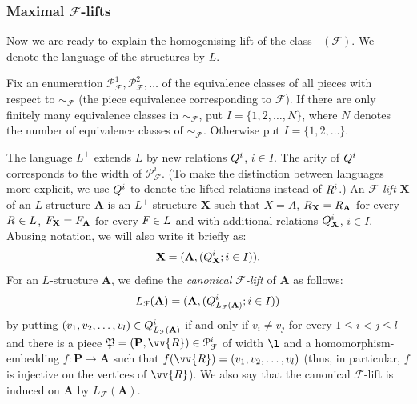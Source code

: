 \documentclass{elsarticle}
\def\Forb{\mathop{\mathrm{Forb_{he}}}\nolimits}
\def\str#1{\mathbf {#1}}
\def\nbrel#1#2{R\ifstrempty{#1}{}{_{#1}}\ifstrempty{#2}{}{^{#2}}}
\def\rel#1#2{\nbrel{\ifstrempty{#1}{}{\str{#1}}}{#2}}
\def\func#1#2{\nbfunc{\ifstrempty{#1}{}{\str{#1}}}{#2}}
\def\nbfunc#1#2{F\ifstrempty{#1}{}{_{#1}}\ifstrempty{#2}{}{^{#2}}}
\def\extl#1#2{Q\ifstrempty{#1}{}{_{#1}}\ifstrempty{#2}{}{^{#2}}}
\def\ext#1#2{\extl{\ifstrempty{#1}{}{\str{#1}}}{#2}}
\def\F{{\mathcal F}}
\def\Piece{{\mathfrak P}}
\def\PieceEq{{\mathcal P}}
\theoremstyle{plain}
\theoremstyle{definition}
\theoremstyle{remark}
\begin{document}
\subsubsection{Maximal $\F$-lifts}
\label{sec:Flifts}
Now we are ready to explain the homogenising lift of the class $\Forb(\F)$. We
denote the language of the structures by $L$.

Fix an enumeration $\PieceEq_\F^1, \PieceEq_\F^2,\ldots$ of the equivalence
classes of all pieces with respect to $\sim_\F$ (the piece equivalence corresponding to $\F$).  If there are only finitely many equivalence
classes in $\sim_\F$, put $I=\{1,2,\ldots, N\}$, where $N$ denotes the number
of equivalence classes of $\sim_\F$. Otherwise put $I=\{1,2,\ldots\}$.  

The language $L^+$ extends $L$ by new relations $\ext{}{i}$, $i\in I$. The arity of $\ext{}{i}$ corresponds
to the width of $\PieceEq_\F^i$. (To make the distinction between languages more explicit, we use $\ext{}{i}$ to denote the lifted relations instead of $\rel{}{i}$.)
An \emph{$\F$-lift} $\str{X}$ of an $L$-structure $\str{A}$ is an $L^+$-structure $\str{X}$ such that $X=A$, $\rel{X}{}=\rel{A}{}$ for every $\rel{}{}\in L$, $\func{X}{}=\func{A}{}$ for every $\func{}{}\in L$ and with additional relations $\ext{X}{i}$, $i\in I$. Abusing notation, we will also write it briefly as:
$$\str{X}=(\str{A},(\ext{X}{i};i\in I)).$$
For an $L$-structure $\str A$, we define the \emph{canonical $\F$-lift}
of $\str A$ as follows:
$$L_\F({\str A})=(\str{A},(\extl{L_\F(\str{A})}{i}; i\in I))$$
by putting $(v_1,v_2,\ldots,v_l)\in
\extl{L_\F(\str{A})}{i}$ if and only if $v_i\neq v_j$ for every $1\leq i<j\leq l$ and there is a piece
$\Piece=(\str{P},\vv{R})\in \PieceEq_\F^i$ of width $\l$ and a homomorphism-embedding $f\colon \str{P}\to\str{A}$ such that
$f(\vv{R})=(v_1,v_2,\ldots,v_l)$ (thus, in particular, $f$ is injective on the vertices of $\vv{R}$).
We also say that the canonical $\F$-lift is induced on $\str{A}$ by $L_\F(\str{A})$.
\end{document}
